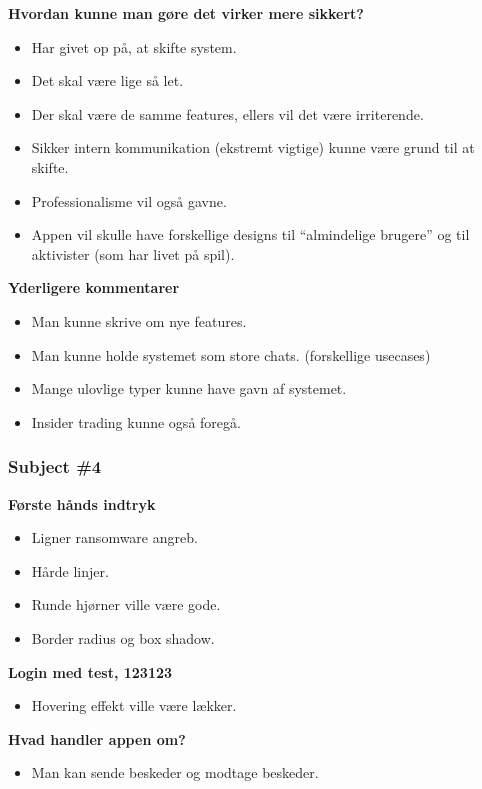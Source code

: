 \noindent\textbf{Hvordan kunne man gøre det virker mere sikkert?}
\begin{itemize}
    \item Har givet op på, at skifte system.
    \item Det skal være lige så let.
    \item Der skal være de samme features, ellers vil det være irriterende.
    \item Sikker intern kommunikation (ekstremt vigtige) kunne være grund til at skifte.
    \item Professionalisme vil også gavne.
    \item Appen vil skulle have forskellige designs til “almindelige brugere” og til aktivister (som har livet på spil).
\end{itemize}

\noindent\textbf{Yderligere kommentarer}
\begin{itemize}
    \item Man kunne skrive om nye features.
    \item Man kunne holde systemet som store chats. (forskellige usecases)
    \item Mange ulovlige typer kunne have gavn af systemet.
    \item Insider trading kunne også foregå.
\end{itemize}

\subsubsection{Subject \#4}

\noindent\textbf{Første hånds indtryk}
\begin{itemize}
    \item Ligner ransomware angreb.
    \item Hårde linjer.
    \item Runde hjørner ville være gode.
    \item Border radius og box shadow.
\end{itemize}

\noindent\textbf{Login med test, 123123}
\begin{itemize}
    \item Hovering effekt ville være lækker.
\end{itemize}

\noindent\textbf{Hvad handler appen om?}
\begin{itemize}
    \item Man kan sende beskeder og modtage beskeder.
\end{itemize}

